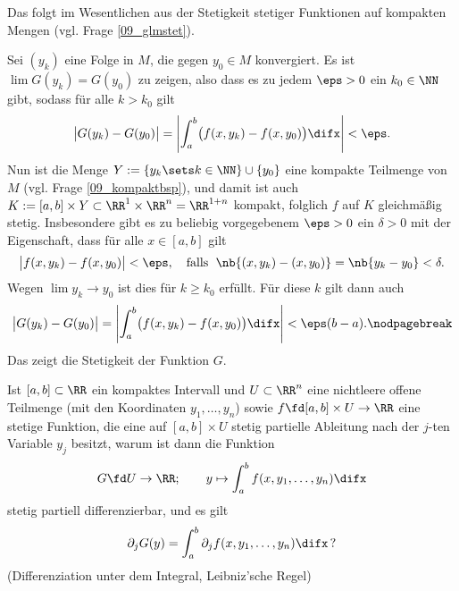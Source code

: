 \begin{antwort}
  Das folgt im Wesentlichen aus der 
   Stetigkeit stetiger Funktionen 
  auf kompakten Mengen (vgl. Frage \ref{09_glmstet}). 

  Sei $(y_k)$ eine Folge in $M$, die gegen $y_0 \in M$ konvergiert. 
  Es ist $\lim G(y_k)=G(y_0)$ zu zeigen, also dass es zu jedem 
  $\eps>0$ ein $k_0\in \NN$ gibt, sodass für alle $k>k_0$ gilt 
  \[
  \bigl| G(y_k) - G(y_0) \bigr| = \left| \int_a^b 
    \bigl( f(x,y_k)- f(x,y_0) \bigr) \difx \right| < \eps.
  \]
  Nun ist die Menge $Y:= \{ y_k \sets k\in \NN \}\cup\{ y_0\}$ 
  eine kompakte Teilmenge von $M$ (vgl. Frage \ref{09_kompaktbsp}), 
  und damit ist auch $K := [a,b]\times Y 
  \subset \RR^1\times \RR^n = \RR^{1+n}$ kompakt, 
  folglich $f$ auf $K$ gleichmäßig stetig. 
  Insbesondere gibt es zu beliebig 
  vorgegebenem $\eps>0$ ein $\delta>0$ mit der Eigenschaft, 
  dass für alle $x\in [a,b]$ gilt
  \[
  \bigl| f(x,y_k)-f(x,y_0) \bigr| < \eps, 
  \quad\text{falls\; $\nb{ (x,y_k) -(x,y_0) } = \nb{ y_k -y_0 } < \delta.$} 
  \]
  Wegen $\lim y_k \to y_0$ ist dies für $k\ge k_0$ erfüllt. Für diese 
  $k$ gilt dann auch
  \[
  \bigl| G(y_k)-G(y_0) \bigr| = \left| \int_a^b 
    \bigl( f(x,y_k)-f(x,y_0) \bigr)  \difx \right| < \eps(b-a). \nodpagebreak
  \]
  Das zeigt die Stetigkeit der Funktion $G$. \AntEnd
\end{antwort}

\begin{frage}\label{11_paramdiff}
  Ist $[a,b]\subset\RR$ ein kompaktes Intervall und $U\subset \RR^n$ 
  eine nichtleere offene Teilmenge (mit den Koordinaten $y_1,\ldots,y_n$) sowie 
  $f\fd [a,b]\times U\to\RR$ eine stetige Funktion, die eine auf 
  $[a,b]\times U$ stetig partielle Ableitung nach der $j$-ten Variable $y_j$ 
  besitzt, warum ist dann die Funktion 
  \[
  G \fd U \to \RR; \qquad y \mapsto \int_a^b f(x,y_1,\ldots,y_n)\difx 
  \]
  stetig partiell differenzierbar, und es gilt 
  \[
  \partial_j G(y) = \int_a^b \partial_j f(x,y_1,\ldots,y_n) \difx \,\text{?}
  \]
  (Differenziation unter dem Integral, Leibniz'sche Regel)
\end{frage} 

